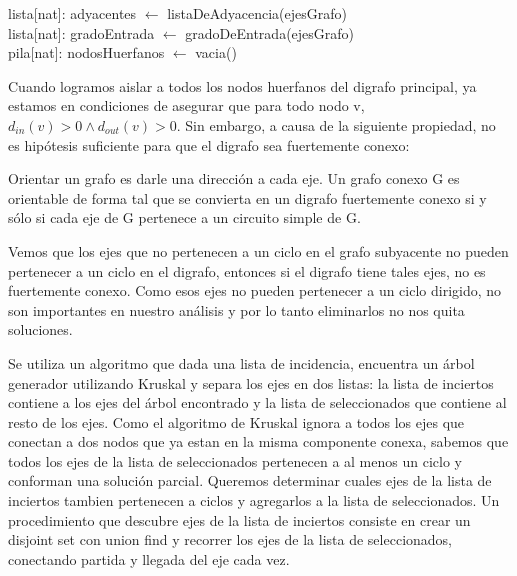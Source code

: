 \begin{algorithm}[H]
		\NoCaptionOfAlgo
		\caption{}
		
		lista[nat]: adyacentes $\leftarrow$ listaDeAdyacencia(ejesGrafo)\\
		lista[nat]: gradoEntrada $\leftarrow$ gradoDeEntrada(ejesGrafo)\\
		pila[nat]: nodosHuerfanos $\leftarrow$ vacia()\\

	\end{algorithm}


Cuando logramos aislar a todos los nodos huerfanos del digrafo principal, ya estamos en condiciones de asegurar que para todo nodo v, $d_{in} (v) > 0 \land d_{out} (v) > 0$. Sin embargo, a causa de la siguiente propiedad, no es hipótesis suficiente para que el digrafo sea fuertemente conexo:
\\
\par
\begin{center}
Orientar un grafo es darle una dirección a cada eje. Un grafo conexo G es orientable de forma tal que se convierta en un digrafo fuertemente conexo si y sólo si cada eje de G pertenece a un circuito simple de G.
\end{center}

Vemos que los ejes que no pertenecen a un ciclo en el grafo subyacente no pueden pertenecer a un ciclo en el digrafo, entonces si el digrafo tiene tales ejes, no es fuertemente conexo. Como esos ejes no pueden pertenecer a un ciclo dirigido, no son importantes en nuestro análisis y por lo tanto eliminarlos no nos quita soluciones.

Se utiliza un algoritmo que dada una lista de incidencia, encuentra un árbol generador utilizando Kruskal y separa los ejes en dos listas: la lista de inciertos contiene a los ejes del árbol encontrado y la lista de seleccionados que contiene al resto de los ejes. Como el algoritmo de Kruskal ignora a todos los ejes que conectan a dos nodos que ya estan en la misma componente conexa, sabemos que todos los ejes de la lista de seleccionados pertenecen a al menos un ciclo y conforman una solución parcial. Queremos determinar cuales ejes de la lista de inciertos tambien pertenecen a ciclos y agregarlos a la lista de seleccionados. Un procedimiento que descubre ejes de la lista de inciertos consiste en crear un disjoint set con union find y recorrer los ejes de la lista de seleccionados, conectando partida y llegada del eje cada vez.
